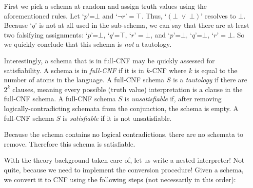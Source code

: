  First we pick a schema at random and assign truth values using the aforementioned rules. Let `$p$'=$\bot$ and `$\lnot{r}$'$=\top$. Thus, `$(\bot\;\lor\;\bot)$' resolves to $\bot$. Because `$q$' is not at all used in the sub-schema, we can say that there are at least two falsifying assignments: `$p$'=$\bot$, `$q$'=$\top$, `$r$'$=\bot$, and `$p$'=$\bot$, `$q$'=$\bot$, `$r$'$=\bot$. So we quickly conclude that this schema is \textit{not} a tautology.

Interestingly, a schema that is in full-CNF may be quickly assessed for satisfiability. A schema is in \textit{full-CNF} if it is in $k$-CNF where $k$ is equal to the number of atoms in the language. A full-CNF schema $S$ is a \textit{tautology} if there are $2^{k}$ clauses, meaning every possible (truth value) interpretation is a clause in the full-CNF schema. A full-CNF schema $S$ is \textit{unsatisfiable} if, after removing logically-contradicting schemata from the conjunction, the schema is empty. A full-CNF schema $S$ is \textit{satisfiable} if it is not unsatisfiable.

 Because the schema contains no logical contradictions, there are no schemata to remove. Therefore this schema is satisfiable.

With the theory background taken care of, let us write a nested interpreter! Not quite, because we need to implement the conversion procedure! Given a schema, we convert it to CNF using the following steps (not necessarily in this order):

